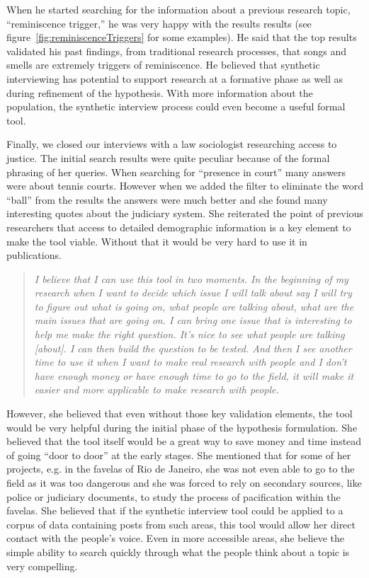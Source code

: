 \documentclass{sigchi}
\begin{document}
When he started searching for the information about a previous research topic, ``reminiscence trigger,'' he was very happy with the results results (see figure~\ref{fig:reminiscenceTriggers} for some examples). He said that the top results validated his past findings, from traditional research processes, that songs and smells are extremely triggers of reminiscence. He believed that synthetic interviewing has potential to support research at a formative phase as well as during refinement of the hypothesis. With more information about the population, the synthetic interview process could even become a useful formal tool.

Finally, we closed our interviews with a law sociologist researching access to justice. The initial search results were quite peculiar because of the formal phrasing of her queries. When searching for ``presence in court'' many answers were about tennis courts. However when we added the filter to eliminate the word ``ball'' from the results the answers were much better and she found many interesting quotes about the judiciary system. She reiterated the point of previous researchers that access to detailed demographic information is a key element to make the tool viable. Without that it would be very hard to use it in publications.


\begin{quote}
{\em
I believe that I can use this tool in two moments. In the beginning of my research when I want to decide which issue I will talk about say I will try to figure out what is going on, what people are talking about, what are the main issues that are going on. I can bring one issue that is interesting to help me make the right question. It's nice to see what people are talking [about]. I can then build the question to be tested. And then I see another time to use it when I want to make real research with people and I don't have enough money or have enough time to go to the field, it will make it easier and more applicable to make research with people. 
}\end{quote}

However, she believed that even without those key validation elements, the tool would be very helpful during the initial phase of the hypothesis formulation. She believed that the tool itself would be a great way to save money and time instead of going ``door to door'' at the early stages. She mentioned that for some of her projects, e.g. in the favelas of Rio de Janeiro, she was not even able to go to the field as it was too dangerous and she was forced to rely on secondary sources, like police or judiciary documents, to study the process of pacification within the favelas. She believed that if the synthetic interview tool could be applied to a corpus of data containing posts from such areas, this tool would allow her direct contact with the people's voice. Even in more accessible areas, she believe the simple ability to search quickly through what the people think about a topic is very compelling. 
\end{document}
